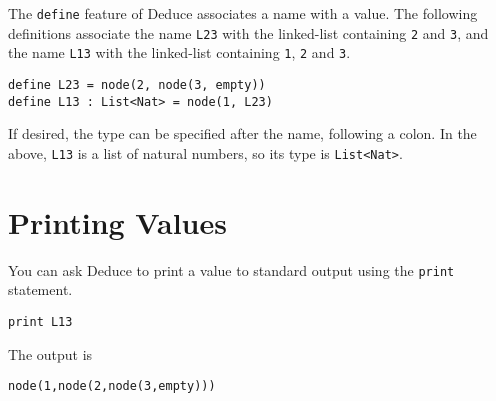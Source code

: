 \documentclass[12pt]{article}
\begin{document}
The \texttt{define} feature of Deduce associates a name with a value.  The
following definitions associate the name \texttt{L23} with the
linked-list containing \texttt{2} and \texttt{3}, and the name \texttt{L13} with the
linked-list containing \texttt{1}, \texttt{2} and \texttt{3}.

\begin{verbatim}
define L23 = node(2, node(3, empty))
define L13 : List<Nat> = node(1, L23)
\end{verbatim}

If desired, the type can be specified after the name, following a
colon.  In the above, \texttt{L13} is a list of natural numbers, so its type
is \texttt{List<Nat>}.

\section{Printing Values}

You can ask Deduce to print a value to standard output using the
\texttt{print} statement.

\begin{verbatim}
print L13
\end{verbatim}

The output is

\begin{verbatim}
node(1,node(2,node(3,empty)))
\end{verbatim}
\end{document}
